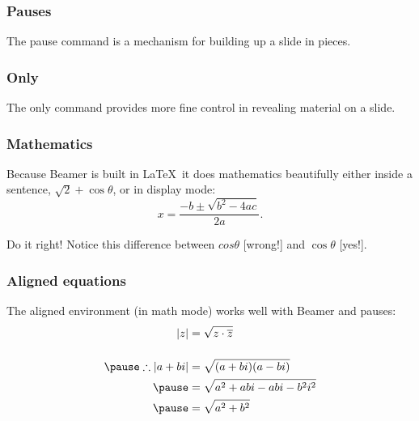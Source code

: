 \documentclass[t,14pt]{beamer}
\begin{document}
\begin{frame}
  \frametitle{Pauses}
  \Large The \alert{pause} command 
  \pause 
  is a mechanism for building up a slide in pieces.
\end{frame}


\begin{frame}
  \frametitle{Only}
  \large  

  The \alert{only} command provides more fine control in revealing
  material on a slide.




\end{frame}

\begin{frame}
  \frametitle{Mathematics}
  \large
  Because Beamer is built in \LaTeX\ it does mathematics beautifully
  either inside a sentence, $\sqrt2 + \cos\theta$, or in display mode:
  \[
  x = \frac{-b \pm \sqrt{b^2-4ac}}{2a} .
  \]

  Do it right! Notice this difference between $cos\theta$ [wrong!] and
  $\cos\theta$ [yes!]. 
\end{frame}

\begin{frame}
  \frametitle{Aligned equations}
  \large The \alert{aligned} environment (in math mode) works well
  with Beamer and pauses:
  \[
  \begin{aligned}
    |z| &= \sqrt{z \cdot \overline{z}} \\[12pt]
    \pause
    \therefore |a+bi| &= \sqrt{(a+bi)(a-bi)} \\ \pause
    &= \sqrt{a^2 +abi -abi - b^2i^2} \\ \pause
    &= \sqrt{a^2 + b^2}
  \end{aligned}
  \]
\end{frame}
\end{document}
